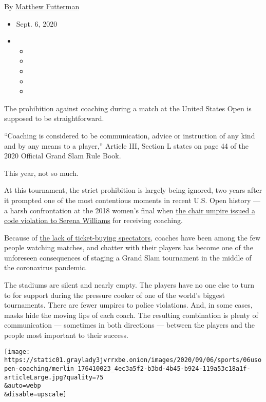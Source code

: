 By
\href{https://www.nytimes3xbfgragh.onion/by/matthew-futterman}{Matthew
Futterman}

\begin{itemize}
\item
  Sept. 6, 2020
\item
  \begin{itemize}
  \item
  \item
  \item
  \item
  \item
  \end{itemize}
\end{itemize}

The prohibition against coaching during a match at the United States
Open is supposed to be straightforward.

``Coaching is considered to be communication, advice or instruction of
any kind and by any means to a player,'' Article III, Section L states
on page 44 of the 2020 Official Grand Slam Rule Book.

This year, not so much.

At this tournament, the strict prohibition is largely being ignored, two
years after it prompted one of the most contentious moments in recent
U.S. Open history --- a harsh confrontation at the 2018 women's final
when
\href{https://www.nytimes3xbfgragh.onion/2018/09/10/sports/the-coaching-rule-that-upset-serena-williams-explained.html}{the
chair umpire issued a code violation to Serena Williams} for receiving
coaching.

Because of
\href{https://www.nytimes3xbfgragh.onion/2020/08/31/sports/tennis/us-open.html}{the
lack of ticket-buying spectators}, coaches have been among the few
people watching matches, and chatter with their players has become one
of the unforeseen consequences of staging a Grand Slam tournament in the
middle of the coronavirus pandemic.

The stadiums are silent and nearly empty. The players have no one else
to turn to for support during the pressure cooker of one of the world's
biggest tournaments. There are fewer umpires to police violations. And,
in some cases, masks hide the moving lips of each coach. The resulting
combination is plenty of communication --- sometimes in both directions
--- between the players and the people most important to their success.

\texttt{[image: https://static01.graylady3jvrrxbe.onion/images/2020/09/06/sports/06usopen-coaching/merlin\_176410023\_4ec3a5f2-b3bd-4b45-b924-119a53c18a1f-articleLarge.jpg?quality=75\\\&auto=webp\\\&disable=upscale]}

